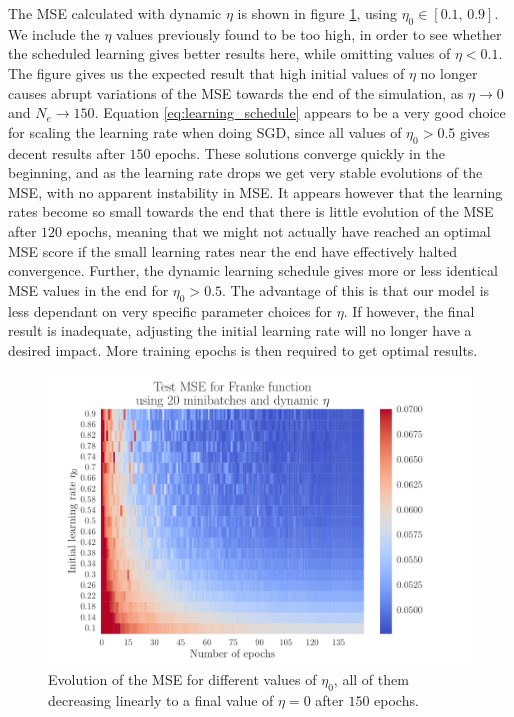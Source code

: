 \documentclass[12pt]{extarticle}
\begin{document}
The MSE calculated with dynamic $\eta$ is shown in figure \ref{fig:SGD_Franke_epochs_dynamic_eta}, using $\eta_0\in[0.1,\,0.9]$. We include the $\eta$ values previously found to be too high, in order to see whether the scheduled learning gives better results here, while omitting values of $\eta<0.1$. The figure gives us the expected result that high initial values of $\eta$ no longer causes abrupt variations of the MSE towards the end of the simulation, as $\eta\to0$ and $N_e\to150$. Equation \eqref{eq:learning_schedule} appears to be a very good choice for scaling the learning rate when doing SGD, since all values of $\eta_0>0.5$ gives decent results after $150$ epochs. These solutions converge quickly in the beginning, and as the learning rate drops we get very stable evolutions of the MSE, with no apparent instability in MSE. It appears however that the learning rates become so small towards the end that there is little evolution of the MSE after $120$ epochs, meaning that we might not actually have reached an optimal MSE score if the small learning rates near the end have effectively halted convergence. Further, the dynamic learning schedule gives more or less identical MSE values in the end for $\eta_0>0.5$. The advantage of this is that our model is less dependant on very specific parameter choices for $\eta$. If however, the final result is inadequate, adjusting the initial learning rate will no longer have a desired impact. More training epochs is then required to get optimal results.

\begin{figure}[h!]
	\includegraphics[width=0.9\linewidth]{SGD_Franke/reg_Franke__epochs_dynamic_eta__Test_MSE__792536.pdf}
	\caption{Evolution of the MSE for different values of $\eta_0$, all of them decreasing linearly to a final value of $\eta=0$ after $150$ epochs.}
	\label{fig:SGD_Franke_epochs_dynamic_eta}
\end{figure}
\end{document}
